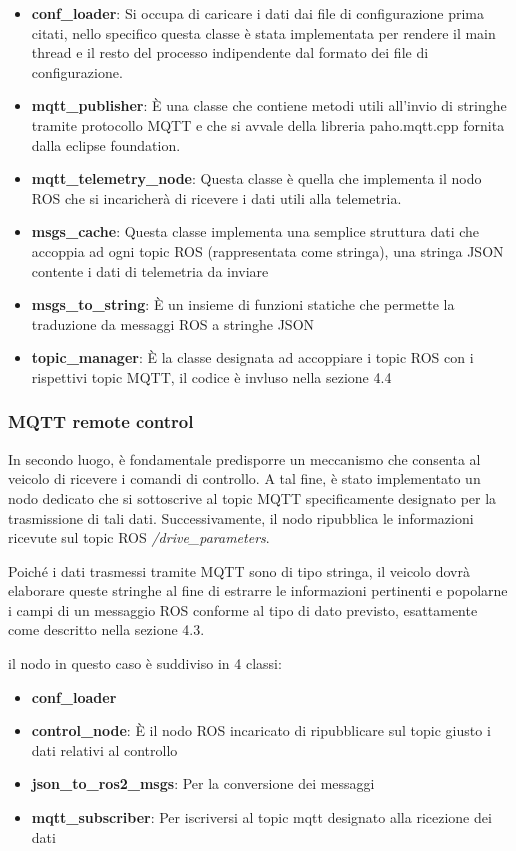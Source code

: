 \begin{itemize}
  \item \textbf{conf\_loader}: Si occupa di caricare i dati dai file di configurazione prima citati, nello specifico questa classe è stata implementata per rendere il main thread e il resto del processo indipendente dal formato dei file di configurazione.
  \item \textbf{mqtt\_publisher}: È una classe che contiene metodi utili all'invio di stringhe tramite protocollo MQTT e che si avvale della libreria paho.mqtt.cpp fornita dalla eclipse foundation. 
  \item \textbf{mqtt\_telemetry\_node}: Questa classe è quella che implementa il nodo ROS che si incaricherà di ricevere i dati utili alla telemetria.
  \item \textbf{msgs\_cache}: Questa classe implementa una semplice struttura dati che accoppia ad ogni topic ROS (rappresentata come stringa), una stringa JSON contente i dati di telemetria da inviare
  \item \textbf{msgs\_to\_string}: È un insieme di funzioni statiche che permette la traduzione da messaggi ROS a stringhe JSON
  \item \textbf{topic\_manager}: È la classe designata ad accoppiare i topic ROS con i rispettivi topic MQTT, il codice è invluso nella sezione 4.4 
\end{itemize}

\subsubsection{MQTT remote control}
In secondo luogo, è fondamentale predisporre un meccanismo che consenta al veicolo di ricevere i comandi di controllo. A tal fine, è stato implementato un nodo dedicato che si sottoscrive al topic MQTT specificamente designato per la trasmissione di tali dati. Successivamente, il nodo ripubblica le informazioni ricevute sul topic ROS \textit{/drive\_parameters}.

\noindent Poiché i dati trasmessi tramite MQTT sono di tipo stringa, il veicolo dovrà elaborare queste stringhe al fine di estrarre le informazioni pertinenti e popolarne i campi di un messaggio ROS conforme al tipo di dato previsto, esattamente come descritto nella sezione 4.3.

\noindent il nodo in questo caso è suddiviso in 4 classi: 

\begin{itemize}
  \item \textbf{conf\_loader}
  \item \textbf{control\_node}: È il nodo ROS incaricato di ripubblicare sul topic giusto i dati relativi al controllo
  \item \textbf{json\_to\_ros2\_msgs}: Per la conversione dei messaggi
  \item \textbf{mqtt\_subscriber}: Per iscriversi al topic mqtt designato alla ricezione dei dati
\end{itemize}

